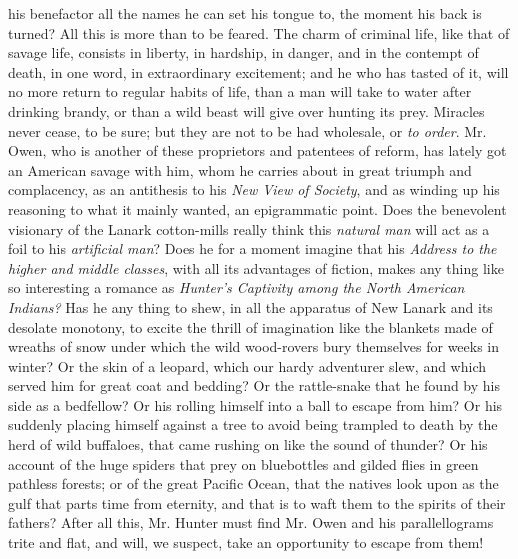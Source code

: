 his benefactor all the names he can set his tongue to, the moment
his back is turned? All this is more than to be feared. The charm
of criminal life, like that of savage life, consists in liberty,
in hardship, in danger, and in the contempt of death, in one word,
in extraordinary excitement; and he who has tasted of it, will no
more return to regular habits of life, than a man will take to
water after drinking brandy, or than a wild beast will give over
hunting its prey.  Miracles never cease, to be sure; but they are
not to be had wholesale, or \emph{to order}. Mr. Owen, who is
another of these proprietors and patentees of reform, has lately
got an American savage with him, whom he carries about in great
triumph and complacency, as an antithesis to his \emph{New View of
Society}, and as winding up his reasoning to what it mainly
wanted, an epigrammatic point. Does the benevolent visionary of
the Lanark cotton-mills really think this \emph{natural man} will
act as a foil to his \emph{artificial man}? Does he for a moment
imagine that his \emph{Address to the higher and middle classes},
with all its advantages of fiction, makes any thing like so
interesting a romance as \emph{Hunter's Captivity among the North
American Indians?} Has he any thing to shew, in all the apparatus
of New Lanark and its desolate monotony, to excite the thrill of
imagination like the blankets made of wreaths of snow under which
the wild wood-rovers bury themselves for weeks in winter? Or the
skin of a leopard, which our hardy adventurer slew, and which
served him for great coat and bedding? Or the rattle-snake that he
found by his side as a bedfellow? Or his rolling himself into a
ball to escape from him? Or his suddenly placing himself against a
tree to avoid being trampled to death by the herd of wild
buffaloes, that came rushing on like the sound of thunder? Or his
account of the huge spiders that prey on bluebottles and gilded
flies in green pathless forests; or of the great Pacific Ocean,
that the natives look upon as the gulf that parts time from
eternity, and that is to waft them to the spirits of their
fathers? After all this, Mr. Hunter must find Mr. Owen and his
parallellograms trite and flat, and will, we suspect, take an
opportunity to escape from them!

